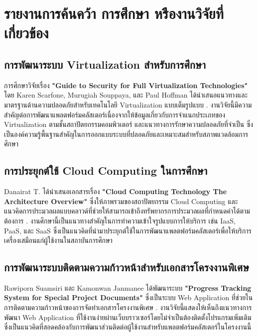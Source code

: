 \section{รายงานการค้นคว้า การศึกษา หรืองานวิจัยที่เกี่ยวข้อง}

\subsection{การพัฒนาระบบ Virtualization สำหรับการศึกษา}
\hspace*{1.3em} %
การศึกษาวิจัยเรื่อง \textbf{"Guide to Security for Full Virtualization Technologies"} โดย Karen Scarfone, Murugiah Souppaya, และ Paul Hoffman ได้นำเสนอแนวทางและมาตรฐานด้านความปลอดภัยสำหรับเทคโนโลยี Virtualization แบบเต็มรูปแบบ \parencite{GuideToSecurityforFullVT}. งานวิจัยนี้มีความสำคัญต่อการพัฒนาแพลตฟอร์มคลัสเตอร์เนื่องจากให้ข้อมูลเกี่ยวกับการจำแนกประเภทของ Virtualization ตามชั้นสถาปัตยกรรมคอมพิวเตอร์ และแนวทางการรักษาความปลอดภัยที่จำเป็น ซึ่งเป็นองค์ความรู้พื้นฐานสำคัญในการออกแบบระบบที่ปลอดภัยและเหมาะสมสำหรับสภาพแวดล้อมการศึกษา

\subsection{การประยุกต์ใช้ Cloud Computing ในการศึกษา}
\hspace*{1.3em} %
Danairat T. ได้นำเสนอเอกสารเรื่อง \textbf{"Cloud Computing Technology The Architecture Overview"} ซึ่งให้ภาพรวมของสถาปัตยกรรม Cloud Computing และแนวคิดการประมวลผลแบบคลาวด์ที่ช่วยให้สามารถเข้าถึงทรัพยากรการประมวลผลที่กำหนดค่าได้ตามต้องการ \parencite{CloudComputingTechnologyTheArch}. งานศึกษานี้เป็นแนวทางสำคัญในการทำความเข้าใจรูปแบบการให้บริการ เช่น IaaS, PaaS, และ SaaS ซึ่งเป็นแนวคิดที่นำมาประยุกต์ใช้ในการพัฒนาแพลตฟอร์มคลัสเตอร์เพื่อให้บริการเครื่องเสมือนแก่ผู้ใช้งานในสถาบันการศึกษา

\subsection{การพัฒนาระบบติดตามความก้าวหน้าสำหรับเอกสารโครงงานพิเศษ}
\hspace*{1.3em} %
Rawiporn Suamsiri และ Kamonwan Janmanee ได้พัฒนาระบบ \textbf{"Progress Tracking System for Special Project Documents"} ซึ่งเป็นระบบ Web Application ที่ช่วยในการติดตามความก้าวหน้าของการจัดทำเอกสารโครงงานพิเศษ \parencite{suamsiri2024_progress_tracking}. งานวิจัยนี้แสดงให้เห็นถึงแนวทางการพัฒนา Web Application ที่ใช้งานง่ายผ่านเว็บบราวเซอร์โดยไม่จำเป็นต้องติดตั้งโปรแกรมเพิ่มเติม ซึ่งเป็นแนวคิดที่สอดคล้องกับการพัฒนาส่วนติดต่อผู้ใช้งานสำหรับแพลตฟอร์มคลัสเตอร์ในโครงงานนี้

